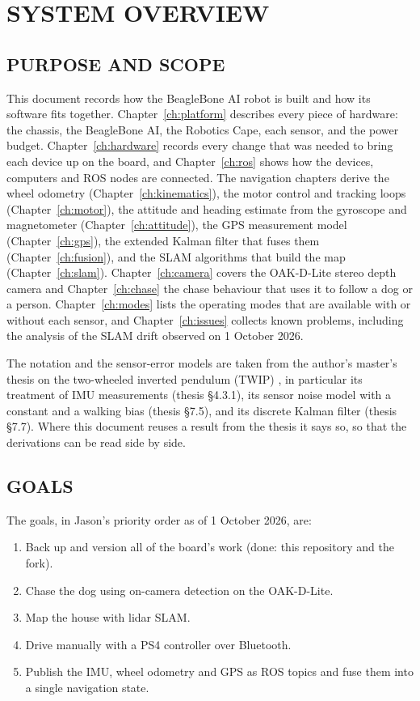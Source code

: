 \chapter{SYSTEM OVERVIEW}
\label{ch:overview}

\section{PURPOSE AND SCOPE}

This document records how the BeagleBone AI robot is built and how its
software fits together. Chapter~\ref{ch:platform} describes every piece of
hardware: the chassis, the BeagleBone AI, the Robotics Cape, each sensor, and
the power budget. Chapter~\ref{ch:hardware} records every change that was
needed to bring each device up on the board, and Chapter~\ref{ch:ros} shows
how the devices, computers and ROS nodes are connected. The navigation
chapters derive the wheel odometry (Chapter~\ref{ch:kinematics}), the motor
control and tracking loops (Chapter~\ref{ch:motor}), the attitude and
heading estimate from the gyroscope and magnetometer
(Chapter~\ref{ch:attitude}), the GPS measurement model
(Chapter~\ref{ch:gps}), the extended Kalman filter that fuses them
(Chapter~\ref{ch:fusion}), and the SLAM algorithms that build the map
(Chapter~\ref{ch:slam}). Chapter~\ref{ch:camera} covers the OAK-D-Lite
stereo depth camera and Chapter~\ref{ch:chase} the chase behaviour that uses
it to follow a dog or a person. Chapter~\ref{ch:modes} lists the operating
modes that are available with or without each sensor, and
Chapter~\ref{ch:issues} collects known problems, including the analysis of
the SLAM drift observed on 1 October 2026.

The notation and the sensor-error models are taken from the author's master's
thesis on the two-wheeled inverted pendulum (TWIP) \cite{stumfoll_twip}, in
particular its treatment of IMU measurements (thesis \S4.3.1), its sensor noise
model with a constant and a walking bias (thesis \S7.5), and its discrete
Kalman filter (thesis \S7.7). Where this document reuses a result from the
thesis it says so, so that the derivations can be read side by side.

\section{GOALS}

The goals, in Jason's priority order as of 1 October 2026, are:
\begin{enumerate}
\item Back up and version all of the board's work (done: this repository and
      the  fork).
\item Chase the dog using on-camera detection on the OAK-D-Lite.
\item Map the house with lidar SLAM.
\item Drive manually with a PS4 controller over Bluetooth.
\item Publish the IMU, wheel odometry and GPS as ROS topics and fuse them into
      a single navigation state.
\end{enumerate}

